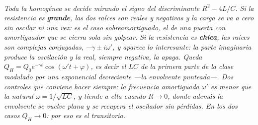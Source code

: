 \begin{center}
\\[0.5em]
{\small\itshape Toda la homogénea se decide mirando el signo del discriminante
$R^2 - 4L/C$. Si la resistencia es \textbf{grande}, las dos raíces son reales y
negativas y la carga se va a cero sin oscilar ni una vez: es el caso
\emph{sobreamortiguado}, el de una puerta con amortiguador que se cierra sola
sin golpear. Si la resistencia es \textbf{chica}, las raíces son complejas
conjugadas, $-\gamma \pm i\omega'$, y aparece lo interesante: la parte
imaginaria produce la oscilación y la real, siempre negativa, la apaga. Queda
$Q_H = Q_0 e^{-\gamma t}\cos(\omega' t + \varphi)$, es decir el $LC$ de la
primera parte de la clase \emph{modulado} por una exponencial decreciente ---la
envolvente punteada---. Dos controles que conviene hacer siempre: la frecuencia
amortiguada $\omega'$ es \emph{menor} que la natural $\omega = 1/\sqrt{LC}$, y
tiende a ella cuando $R\to 0$, donde además la envolvente se vuelve plana y se
recupera el oscilador sin pérdidas. En los dos casos $Q_H\to 0$: por eso es el
transitorio.}
\end{center}
